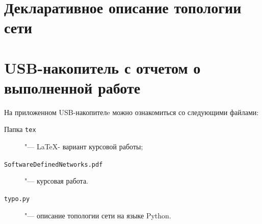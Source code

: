 \documentclass[bachelor, och, coursework]{SCWorks}
\begin{document}




\appendix
\section{Декларативное описание топологии сети}\label{app:topo}


\section{USB-накопитель с отчетом о выполненной работе}\label{app:USB}
На приложенном USB-накопителe можно ознакомиться со следующими файлами:
\begin{description}
\item[Папка \texttt{tex}] "--- \LaTeX- вариант курсовой работы;
\item[\texttt{SoftwareDefinedNetworks.pdf}] "--- курсовая работа.
\item[\texttt{typo.py}] "--- описание топологии сети на языке Python.
\end{description}
\end{document}

